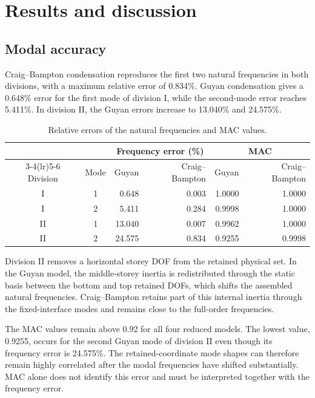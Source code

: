 \documentclass[11pt]{article}
\newenvironment{revision}{\begingroup\color{red}}{\endgroup}
\begin{document}
\section{Results and discussion}\label{sec:results}

\subsection{Modal accuracy}\label{sec:modal-results}

\begin{revision}
Craig--Bampton condensation reproduces the first two natural frequencies in both divisions, with a maximum relative error of 0.834\%. Guyan condensation gives a 0.648\% error for the first mode of division I, while the second-mode error reaches 5.411\%. In division II, the Guyan errors increase to 13.040\% and 24.575\%.
\end{revision}

\begin{table}[H]
\centering
\caption{Relative errors of the natural frequencies and MAC values.}
\label{tab:modal}
\begin{tabular}{ccrrrr}
\toprule
& & \multicolumn{2}{c}{Frequency error (\%)} & \multicolumn{2}{c}{MAC}\\
\cmidrule(lr){3-4}\cmidrule(lr){5-6}
Division & Mode & Guyan & Craig--Bampton & Guyan & Craig--Bampton\\
\midrule
I & 1 & 0.648 & 0.003 & 1.0000 & 1.0000\\
I & 2 & 5.411 & 0.284 & 0.9998 & 1.0000\\
II & 1 & 13.040 & 0.007 & 0.9962 & 1.0000\\
II & 2 & 24.575 & 0.834 & 0.9255 & 0.9998\\
\bottomrule
\end{tabular}
\end{table}

\begin{revision}
Division II removes a horizontal storey DOF from the retained physical set. In the Guyan model, the middle-storey inertia is redistributed through the static basis between the bottom and top retained DOFs, which shifts the assembled natural frequencies. Craig--Bampton retains part of this internal inertia through the fixed-interface modes and remains close to the full-order frequencies.

The MAC values remain above 0.92 for all four reduced models. The lowest value, 0.9255, occurs for the second Guyan mode of division II even though its frequency error is 24.575\%. The retained-coordinate mode shapes can therefore remain highly correlated after the modal frequencies have shifted substantially. MAC alone does not identify this error and must be interpreted together with the frequency error.
\end{revision}
\end{document}
